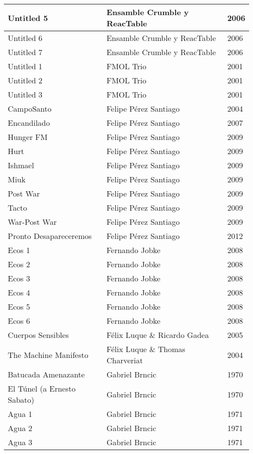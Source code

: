 \begin{center}
\begin{longtable}{ p{}  p{}  p{} }
Untitled 5 & Ensamble Crumble y ReacTable & 2006 \\ \midrule 
Untitled 6 & Ensamble Crumble y ReacTable & 2006 \\ \midrule 
Untitled 7 & Ensamble Crumble y ReacTable & 2006 \\ \midrule 
Untitled 1 & FMOL Trio & 2001 \\ \midrule 
Untitled 2 & FMOL Trio & 2001 \\ \midrule 
Untitled 3 & FMOL Trio & 2001 \\ \midrule 
CampoSanto & Felipe Pérez Santiago & 2004 \\ \midrule 
Encandilado & Felipe Pérez Santiago & 2007 \\ \midrule 
Hunger FM & Felipe Pérez Santiago & 2009 \\ \midrule 
Hurt & Felipe Pérez Santiago & 2009 \\ \midrule 
Ishmael & Felipe Pérez Santiago & 2009 \\ \midrule 
Miuk & Felipe Pérez Santiago & 2009 \\ \midrule 
Post War & Felipe Pérez Santiago & 2009 \\ \midrule 
Tacto & Felipe Pérez Santiago & 2009 \\ \midrule 
War-Post War & Felipe Pérez Santiago & 2009 \\ \midrule 
Pronto Desapareceremos & Felipe Pérez Santiago & 2012 \\ \midrule 
Ecos 1 & Fernando Jobke & 2008 \\ \midrule 
Ecos 2 & Fernando Jobke & 2008 \\ \midrule 
Ecos 3 & Fernando Jobke & 2008 \\ \midrule 
Ecos 4 & Fernando Jobke & 2008 \\ \midrule 
Ecos 5 & Fernando Jobke & 2008 \\ \midrule 
Ecos 6 & Fernando Jobke & 2008 \\ \midrule 
Cuerpos Sensibles & Félix Luque \& Ricardo Gadea & 2005 \\ \midrule 
The Machine Manifesto & Félix Luque \& Thomas Charveriat & 2004 \\ \midrule 
Batucada Amenazante & Gabriel Brncic & 1970 \\ \midrule 
El Túnel (a Ernesto Sabato) & Gabriel Brncic & 1970 \\ \midrule 
Agua 1 & Gabriel Brncic & 1971 \\ \midrule 
Agua 2 & Gabriel Brncic & 1971 \\ \midrule 
Agua 3 & Gabriel Brncic & 1971 \\ \midrule 

\end{longtable}
\end{center}
